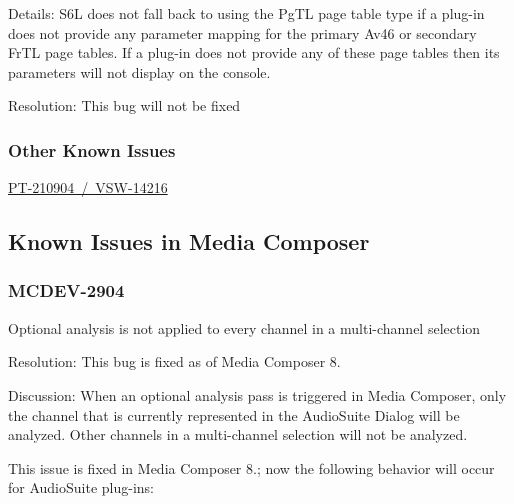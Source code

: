 Details\+: S6L does not fall back to using the {\ttfamily \textquotesingle{}Pg\+TL\textquotesingle{}} page table type if a plug-\/in does not provide any parameter mapping for the primary {\ttfamily \textquotesingle{}Av46\textquotesingle{}} or secondary {\ttfamily \textquotesingle{}Fr\+TL\textquotesingle{}} page tables. If a plug-\/in does not provide any of these page tables then its parameters will not display on the console.

Resolution\+: This bug will not be fixed\hypertarget{a00846_other_knownissues_venue}{}\subsubsection{Other Known Issues}\label{a00846_other_knownissues_venue}

\begin{DoxyItemize}
\item \mbox{\hyperlink{a00846_PT-210904}{P\+T-\/210904 / V\+S\+W-\/14216}}  
\end{DoxyItemize}\hypertarget{a00846_knownissues_mc}{}\subsection{Known Issues in Media Composer}\label{a00846_knownissues_mc}
\hypertarget{a00846_MCDEV-2904}{}\subsubsection{M\+C\+D\+E\+V-\/2904}\label{a00846_MCDEV-2904}
Optional analysis is not applied to every channel in a multi-\/channel selection

Resolution\+: This bug is fixed as of Media Composer 8.

Discussion\+: When an optional analysis pass is triggered in Media Composer, only the channel that is currently represented in the Audio\+Suite Dialog will be analyzed. Other channels in a multi-\/channel selection will not be analyzed.

This issue is fixed in Media Composer 8.; now the following behavior will occur for Audio\+Suite plug-\/ins\+:

